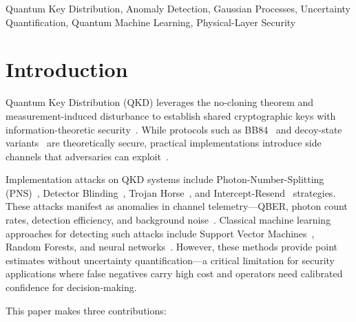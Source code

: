 \documentclass[conference,10pt]{IEEEtran}
\begin{document}
\begin{IEEEkeywords}
Quantum Key Distribution, Anomaly Detection, Gaussian Processes, Uncertainty Quantification, Quantum Machine Learning, Physical-Layer Security
\end{IEEEkeywords}

\section{Introduction}
\label{sec:intro}

Quantum Key Distribution (QKD) leverages the no-cloning theorem and measurement-induced disturbance to establish shared cryptographic keys with information-theoretic security~\cite{bennett1984quantum,gisin2002quantum}. While protocols such as BB84~\cite{bennett1984quantum} and decoy-state variants~\cite{lo2005decoy} are theoretically secure, practical implementations introduce side channels that adversaries can exploit~\cite{l0mti2005attacks,scarani2009security}.

Implementation attacks on QKD systems include Photon-Number-Splitting (PNS)~\cite{huttner1995photon}, Detector Blinding~\cite{makarov2006detector,larger2009controlling}, Trojan Horse~\cite{gisin2006trojan}, and Intercept-Resend~\cite{bennett1992experimental} strategies. These attacks manifest as anomalies in channel telemetry---QBER, photon count rates, detection efficiency, and background noise~\cite{jain2014detector}. Classical machine learning approaches for detecting such attacks include Support Vector Machines~\cite{ren2021machine}, Random Forests, and neural networks~\cite{liu2021qkd}. However, these methods provide point estimates without uncertainty quantification---a critical limitation for security applications where false negatives carry high cost and operators need calibrated confidence for decision-making.

This paper makes three contributions:
\end{document}

